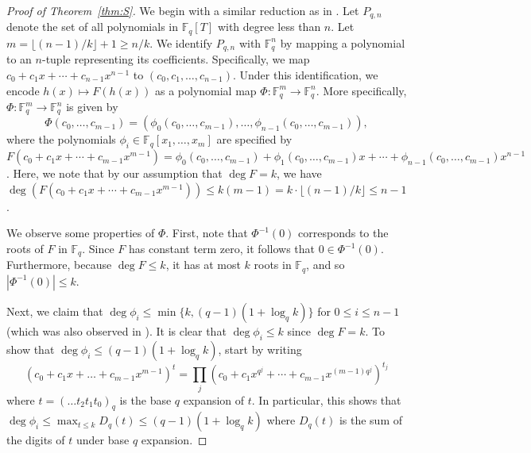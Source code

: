 \documentclass[11pt, reqno]{amsart}
\theoremstyle{definition}
\newcommand{\F}{\mathbb{F}}
\begin{document}
\begin{proof}[Proof of Theorem~\ref{thm:S}]
We begin with a similar reduction as in \cite{G17}. Let $P_{q,n}$ denote the set of all polynomials in $\F_q[T]$ with degree less than $n$. Let $m = \lfloor (n-1)/k \rfloor + 1 \geq n/k$. We identify $P_{q,n}$ with $\F_q^n$ by mapping a polynomial to an $n$-tuple representing its coefficients. Specifically, we map $c_0 + c_1x + \cdots + c_{n-1}x^{n-1}$ to $(c_0, c_1, \ldots, c_{n-1})$. Under this identification, we encode $h(x) \mapsto F(h(x))$ as a polynomial map $\Phi: \F_q^{m} \to \F_q^{n}$. More specifically, $\Phi \colon \F_q^m \to \F_q^n$ is given by
\[ \Phi(c_0, \ldots, c_{m-1}) = (\phi_0(c_0, \ldots, c_{m-1}), \ldots, \phi_{n-1}(c_0, \ldots, c_{m-1})), \]
where the polynomials $\phi_i\in \F_q[x_1, \ldots, x_m]$ are specified by $F(c_0 + c_1x + \cdots + c_{m-1}x^{m-1}) = \phi_0(c_0, \ldots, c_{m-1}) + \phi_1(c_0, \ldots, c_{m-1}) x+\cdots + \phi_{n-1}(c_0, \ldots, c_{m-1})x^{n-1}$. Here, we note that by our assumption that $\deg F = k$, we have $\deg(F(c_0 + c_1x + \cdots +c_{m-1}x^{m-1})) \leq k(m-1)=k\cdot \lfloor (n-1)/k\rfloor \leq n-1$. 

We observe some properties of $\Phi$. First, note that $\Phi^{-1}(0)$ corresponds to the roots of $F$ in $\F_q$. Since $F$ has constant term zero, it follows that $0 \in \Phi^{-1}(0)$. Furthermore, because $\deg F \leq k$, it has at most $k$ roots in $\F_q$, and so $|\Phi^{-1}(0)|\leq k$. 

Next, we claim that $\deg \phi_i \leq \min\{ k, (q-1)(1+ \log_q k) \}$ for $0 \leq i \leq n-1$ (which was also observed in \cite{G17}). It is clear that $ \deg \phi_i \leq k$ since $\deg F = k$. To show that $\deg \phi_i \leq (q-1)(1+ \log_qk)$, start by writing
\[(c_0 + c_1x + \ldots + c_{m-1}x^{m-1})^t = \prod_j\left(c_0 + c_1x^{q^j} + \cdots + c_{m-1}x^{(m-1)q^j} \right)^{t_j}\]
where $t = (\ldots t_2t_1t_0)_{q}$ is the base $q$ expansion of $t$. In particular, this shows that $\deg \phi_i \leq \max_{t \leq k} D_q(t) \leq (q-1)(1+ \log_q k)$ where $D_q(t)$ is the sum of the digits of $t$ under base $q$ expansion.


\end{proof}
\end{document}
